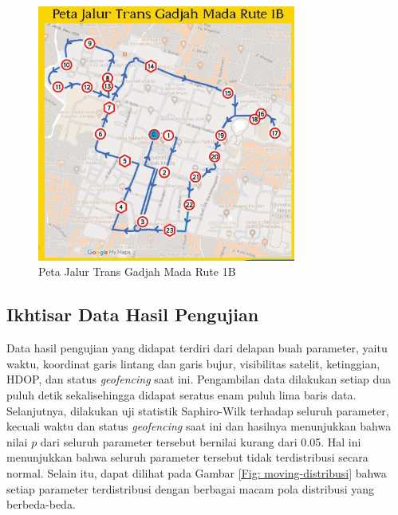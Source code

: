 \begin{figure}[H]
	\centering
	\includegraphics[width=8.5cm]{contents/chapter-4/pengujian-bergerak/Peta-Jalur-Rute-1B.jpg}
	\caption{Peta Jalur Trans Gadjah Mada Rute 1B}
	\label{Fig: peta-1b}
\end{figure}

\subsection{Ikhtisar Data Hasil Pengujian}

Data hasil pengujian yang didapat terdiri dari delapan buah parameter, yaitu waktu, koordinat garis lintang dan garis bujur, visibilitas satelit, ketinggian, HDOP, dan status \textit{geofencing} saat ini. Pengambilan data dilakukan setiap dua puluh detik sekalisehingga didapat seratus enam puluh lima baris data. Selanjutnya, dilakukan uji statistik Saphiro-Wilk terhadap seluruh parameter, kecuali waktu dan status \textit{geofencing} saat ini dan hasilnya menunjukkan bahwa nilai $p$ dari seluruh parameter tersebut bernilai kurang dari 0.05. Hal ini menunjukkan bahwa seluruh parameter tersebut tidak terdistribusi secara normal. Selain itu, dapat dilihat pada Gambar \ref{Fig: moving-distribusi} bahwa setiap parameter terdistribusi dengan berbagai macam pola distribusi yang berbeda-beda.

